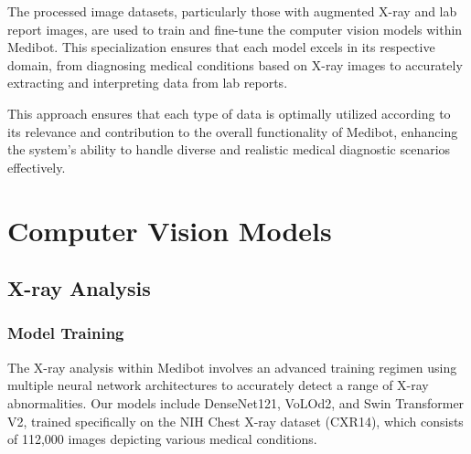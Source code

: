 The processed image datasets, particularly those with augmented X-ray and lab report images, are used to train and fine-tune the computer vision models within Medibot. This specialization ensures that each model excels in its respective domain, from diagnosing medical conditions based on X-ray images to accurately extracting and interpreting data from lab reports.

This approach ensures that each type of data is optimally utilized according to its relevance and contribution to the overall functionality of Medibot, enhancing the system's ability to handle diverse and realistic medical diagnostic scenarios effectively.

\section{Computer Vision Models}
\subsection{X-ray Analysis}

\subsubsection{Model Training}

The X-ray analysis within Medibot involves an advanced training regimen using multiple neural network architectures to accurately detect a range of X-ray abnormalities. Our models include DenseNet121, VoLOd2, and Swin Transformer V2, trained specifically on the NIH Chest X-ray dataset (CXR14), which consists of 112,000 images depicting various medical conditions.

